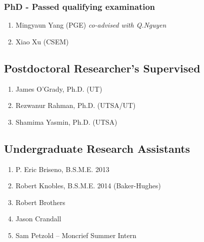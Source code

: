 \subsubsection*{PhD - Passed qualifying examination}
\begin{enumerate}
    \item Mingyaun Yang (PGE) \emph{co-advised with Q.Nguyen}
    \item Xiao Xu (CSEM)
\end{enumerate}



\subsection*{Postdoctoral Researcher's Supervised}
  \begin{enumerate}
      \item James O'Grady, Ph.D. (UT)
      \item Rezwanur Rahman, Ph.D. (UTSA/UT)
      \item Shamima Yasmin, Ph.D. (UTSA)
  \end{enumerate}

\subsection*{Undergraduate Research Assistants}
  \begin{enumerate}
    \item P. Eric Briseno, B.S.M.E. 2013
    \item Robert Knobles, B.S.M.E. 2014 (Baker-Hughes)
    \item Robert Brothers
    \item Jason Crandall
    \item Sam Petzold -- Moncrief Summer Intern
  \end{enumerate}

